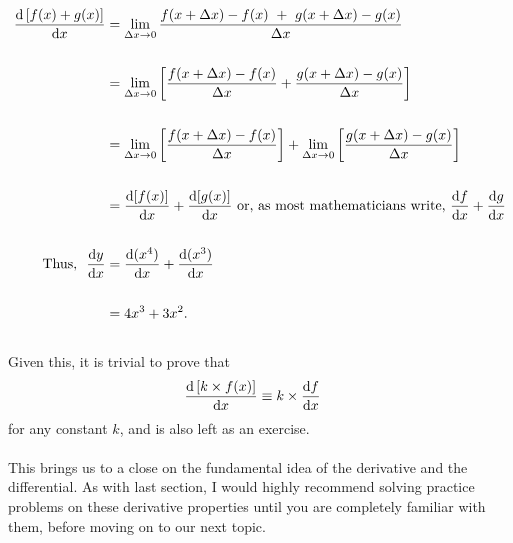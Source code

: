 \documentclass[11pt]{article}
\numberwithin{equation}{section}
\begin{document}
\begin{align*}
	\frac{\textrm{d}\left[ f(x) + g(x) \right]}{\textrm{d}x} &= \lim_{\Delta x \to 0} \frac{f(x + \Delta x) - f(x) \ + \  g(x + \Delta x) - g(x)}{\Delta x} \\ \\
	&= \lim_{\Delta x \to 0} \left[ \frac{f(x + \Delta x) - f(x)}{\Delta x} + \frac{g(x + \Delta x) - g(x)}{\Delta x} \right] \\ \\
	&= \lim_{\Delta x \to 0} \left[ \frac{f(x + \Delta x) - f(x)}{\Delta x} \right] + \lim_{\Delta x \to 0} \left[ \frac{g(x + \Delta x) - g(x)}{\Delta x} \right] \\ \\
	&= \frac{\textrm{d}[f(x)]}{\textrm{d}x} + \frac{\textrm{d}[g(x)]}{\textrm{d}x} \ \textrm{or, as most mathematicians write, } \frac{\textrm{d}f}{\textrm{d}x} + \frac{\textrm{d}g}{\textrm{d}x} \\ \\
	\textrm{Thus, } \ \frac{\textrm{d}y}{\textrm{d}x} &= \frac{\textrm{d}(x^4)}{\textrm{d}x} + \frac{\textrm{d}(x^3)}{\textrm{d}x} \\ \\ &= 4x^3 + 3x^2.
\end{align*}
\\ Given this, it is trivial to prove that 
\begin{align*}
	\frac{\textrm{d}\, [k \times f(x)]}{\textrm{d}x} & \equiv k \times \frac{\textrm{d}f}{\textrm{d}x}
\end{align*}
for any constant \(k\), and is also left as an exercise.
\\ \\ This brings us to a close on the fundamental idea of the derivative and the differential. As with last section, I would highly recommend solving practice problems on these derivative properties until you are completely familiar with them, before moving on to our next topic.

\newpage
\end{document}
